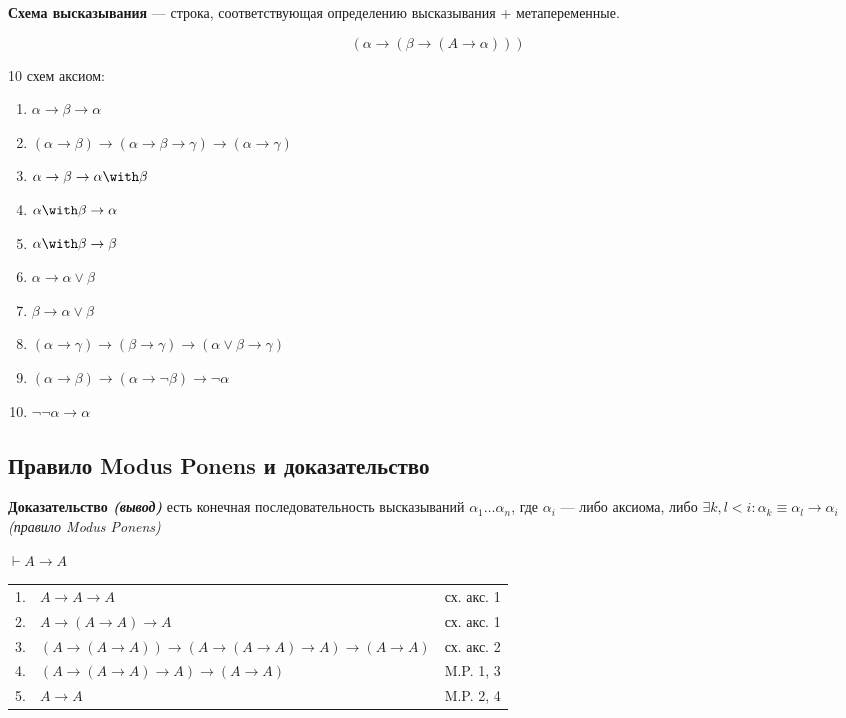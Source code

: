 \begin{definition}
    \textbf{Схема высказывания} --- строка, соответствующая определению высказывания + метапеременные.
\end{definition}

\begin{example}
    \[(\alpha \to (\beta \to (A \to \alpha)))\]
\end{example}

10 схем аксиом:
\begin{enumerate}
    \item \(\alpha \to \beta \to \alpha\)
    \item \((\alpha \to \beta) \to (\alpha \to \beta \to \gamma) \to (\alpha \to \gamma)\)
    \item \(\alpha \to \beta \to \alpha \with \beta\)
    \item \(\alpha \with \beta \to \alpha\)
    \item \(\alpha \with \beta \to \beta\)
    \item \(\alpha \to \alpha \lor \beta\)
    \item \(\beta \to \alpha \lor \beta\)
    \item \((\alpha \to \gamma) \to (\beta \to \gamma) \to (\alpha \lor \beta \to \gamma)\)
    \item \((\alpha \to \beta) \to (\alpha \to \neg \beta) \to \neg \alpha\)
    \item \(\neg \neg \alpha \to \alpha\)
\end{enumerate}

\subsection{Правило Modus Ponens и доказательство}

\begin{definition}
    \textbf{Доказательство \textit{(вывод)}} есть конечная последовательность высказываний \(\alpha_1 \dots \alpha_n\), где \(\alpha_i\) --- либо аксиома, либо \(\exists k, l < i : \alpha_k \equiv \alpha_l \to \alpha_i\) \textit{(правило Modus Ponens)}
\end{definition}

\begin{example}
    \(\vdash A \to A\)

    \begin{tabular}{lll}
        1. & \(A \to A \to A\)                                               & сх. акс. 1 \\
        2. & \(A \to (A \to A) \to A\)                                       & сх. акс. 1 \\
        3. & \((A \to (A \to A)) \to (A \to (A \to A) \to A) \to (A \to A)\) & сх. акс. 2 \\
        4. & \((A \to (A \to A) \to A) \to (A \to A)\)                       & M.P. 1, 3  \\
        5. & \(A \to A\)                                                     & M.P. 2, 4
    \end{tabular}
\end{example}

